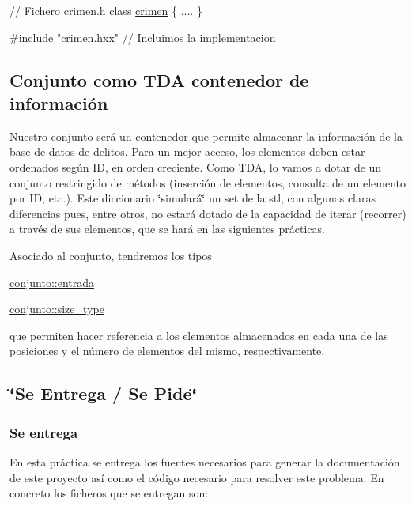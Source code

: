 \begin{DoxyCode}
\textcolor{comment}{// Fichero crimen.h  }
\textcolor{keyword}{class }\hyperlink{classcrimen}{crimen} \{
 ....
\}

\textcolor{preprocessor}{#include "crimen.hxx"} \textcolor{comment}{// Incluimos la implementacion}
\end{DoxyCode}
\hypertarget{index_dicc}{}\subsection{Conjunto como T\+D\+A contenedor de información}\label{index_dicc}
Nuestro conjunto será un contenedor que permite almacenar la información de la base de datos de delitos. Para un mejor acceso, los elementos deben estar ordenados según I\+D, en orden creciente. Como T\+D\+A, lo vamos a dotar de un conjunto restringido de métodos (inserción de elementos, consulta de un elemento por I\+D, etc.). Este diccionario \char`\"{}simulará\char`\"{} un set de la stl, con algunas claras diferencias pues, entre otros, no estará dotado de la capacidad de iterar (recorrer) a través de sus elementos, que se hará en las siguientes prácticas.

Asociado al conjunto, tendremos los tipos 
\begin{DoxyCode}
\hyperlink{classcrimen}{conjunto::entrada}

\hyperlink{classconjunto_a855a5893bb0f5a851ab2dbf2b8aa6cc7}{conjunto::size\_type}
\end{DoxyCode}
 que permiten hacer referencia a los elementos almacenados en cada una de las posiciones y el número de elementos del mismo, respectivamente.\hypertarget{index_sec_tar}{}\subsection{\char`\"{}\+Se Entrega / Se Pide\char`\"{}}\label{index_sec_tar}
\hypertarget{index_ssEntrega}{}\subsubsection{Se entrega}\label{index_ssEntrega}
En esta práctica se entrega los fuentes necesarios para generar la documentación de este proyecto así como el código necesario para resolver este problema. En concreto los ficheros que se entregan son\+:

